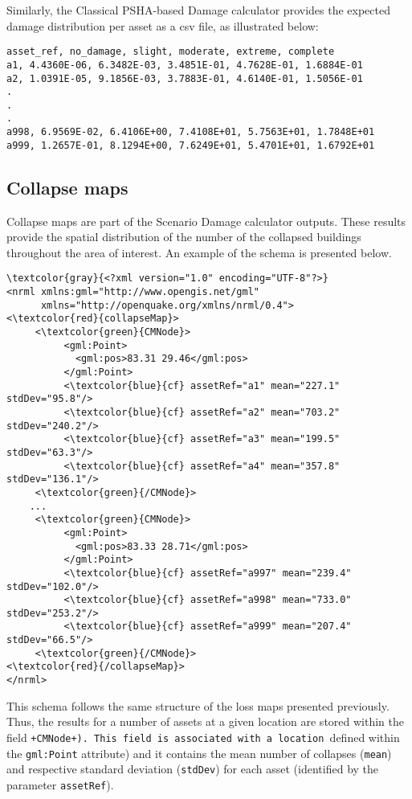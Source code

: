 Similarly, the Classical PSHA-based Damage calculator provides the expected damage distribution per asset as a csv file, as illustrated below:

\begin{Verbatim}[frame=single, commandchars=\\\{\}, samepage=false]
asset_ref, no_damage, slight, moderate, extreme, complete
a1, 4.4360E-06, 6.3482E-03, 3.4851E-01, 4.7628E-01, 1.6884E-01
a2, 1.0391E-05, 9.1856E-03, 3.7883E-01, 4.6140E-01, 1.5056E-01
.
.
.
a998, 6.9569E-02, 6.4106E+00, 7.4108E+01, 5.7563E+01, 1.7848E+01
a999, 1.2657E-01, 8.1294E+00, 7.6249E+01, 5.4701E+01, 1.6792E+01
\end{Verbatim}

\subsection{Collapse maps}
Collapse maps are part of the Scenario Damage calculator outputs. These results provide the spatial distribution of the number of the collapsed buildings throughout the area of interest. An example of the schema is presented below.

\begin{Verbatim}[frame=single, commandchars=\\\{\}, samepage=false]
\textcolor{gray}{<?xml version="1.0" encoding="UTF-8"?>}
<nrml xmlns:gml="http://www.opengis.net/gml"
      xmlns="http://openquake.org/xmlns/nrml/0.4">
<\textcolor{red}{collapseMap}>
     <\textcolor{green}{CMNode}>
          <gml:Point>
            <gml:pos>83.31 29.46</gml:pos>
          </gml:Point>
          <\textcolor{blue}{cf} assetRef="a1" mean="227.1" stdDev="95.8"/>
          <\textcolor{blue}{cf} assetRef="a2" mean="703.2" stdDev="240.2"/>
          <\textcolor{blue}{cf} assetRef="a3" mean="199.5" stdDev="63.3"/>
          <\textcolor{blue}{cf} assetRef="a4" mean="357.8" stdDev="136.1"/>
     <\textcolor{green}{/CMNode}>
    ...
     <\textcolor{green}{CMNode}>
          <gml:Point>
            <gml:pos>83.33 28.71</gml:pos>
          </gml:Point>
          <\textcolor{blue}{cf} assetRef="a997" mean="239.4" stdDev="102.0"/>
          <\textcolor{blue}{cf} assetRef="a998" mean="733.0" stdDev="253.2"/>
          <\textcolor{blue}{cf} assetRef="a999" mean="207.4" stdDev="66.5"/>
     <\textcolor{green}{/CMNode}>
<\textcolor{red}{/collapseMap}>
</nrml>
\end{Verbatim}

This schema follows the same structure of the loss maps presented previously. Thus, the results for a number of \glspl{asset} at a given location are stored within the field \Verb(+CMNode+). This field is associated with a location (defined within the \Verb+gml:Point+ attribute) and it contains the mean number of collapses (\Verb+mean+) and respective standard deviation (\Verb+stdDev+) for each \gls{asset} (identified by the parameter \Verb+assetRef+).


